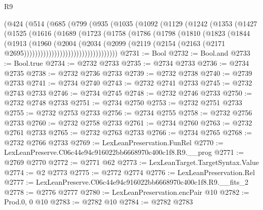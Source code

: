 \begin{lexlean}{R9}
\begin{coremodule}
            (@424
              (@514
                (@685
                  (@799
                    (@935
                      (@1035
                        (@1092
                          (@1129
                            (@1242
                              (@1353
                                (@1427
                                  (@1525
                                    (@1616
                                      (@1689
                                        (@1723
                                          (@1758
                                            (@1786
                                              (@1798
                                                (@1810
                                                  (@1823
                                                    (@1844
                                                      (@1913
                                                        (@1960
                                                          (@2004
                                                            (@2034
                                                              (@2099
                                                                (@2119
                                                                  (@2154
                                                                    (@2163
                                                                      (@2171
                                                                        @2695))))))))))))))))))))))))))))))))))
@2731 := Bool
@2732 := Bool.and
@2733 := Bool.true
@2734 := @2732 @2733
@2735 := @2734 @2733
@2736 := @2734 @2735
@2738 := @2732 @2736 @2733
@2739 := @2732 @2738
@2740 := @2739 @2733
@2741 := @2734 @2740
@2743 := @2732 @2741 @2733
@2745 := @2732 @2743 @2733
@2746 := @2734 @2745
@2748 := @2732 @2746 @2733
@2750 := @2732 @2748 @2733
@2751 := @2734 @2750
@2753 := @2732 @2751 @2733
@2755 := @2732 @2753 @2733
@2756 := @2734 @2755
@2758 := @2732 @2756 @2733
@2760 := @2732 @2758 @2733
@2761 := @2734 @2760
@2763 := @2732 @2761 @2733
@2765 := @2732 @2763 @2733
@2766 := @2734 @2765
@2768 := @2732 @2766 @2733
@2769 := LexLeanPreservation.FunRel
@2770 := LexLeanPreserve.C06c44e94c916022bb6668970c400c1f8.R9.__prog
@2771 := @2769 @2770
@2772 := @2771 @62
@2773 := LexLeanTarget.TargetSyntax.Value
@2774 := @2 @2773
@2775 := @2772 @2774
@2776 := LexLeanPreservation.Rel
@2777 := LexLeanPreserve.C06c44e94c916022bb6668970c400c1f8.R9.__fits_2
@2778 := @2776 @2777
@2780 := LexLeanPreservation.encPair @10
@2782 := Prod.{0, 0} @10
@2783 := @2782 @10
@2784 := @2782 @2783

\end{coremodule}
\end{lexlean}

